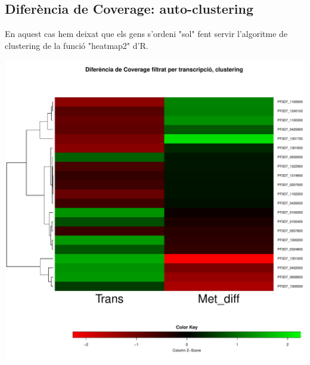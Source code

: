 \documentclass{article}\usepackage[]{graphicx}\usepackage[]{color}
\newenvironment{knitrout}{}{} %
\begin{document}
\subsection{Diferència de Coverage: auto-clustering}
En aquest cas hem deixat que els gens s'ordeni "sol" fent servir l'algoritme de clustering de la funció "heatmap2" d'R.
\begin{knitrout}
\color{fgcolor}

{\centering \includegraphics[width=.9\linewidth]{figure/minimal-heat_cov_diff_filter_cluster-1} 

}



\end{knitrout}
\clearpage
\end{document}
